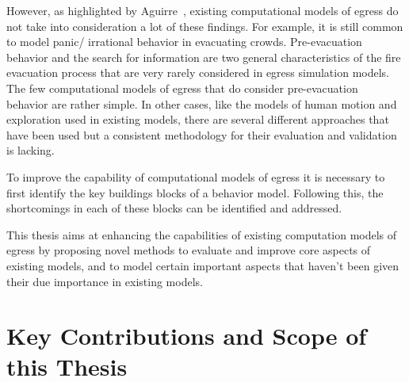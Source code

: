 However, as highlighted by Aguirre~\cite{Aguirre:2004tn}, existing computational models of egress do not take into consideration a lot of these findings. For example, it is still common to model panic/ irrational behavior in evacuating crowds.
 Pre-evacuation behavior and the search for information are two general characteristics of the fire evacuation process that are very rarely considered in egress simulation models. The few computational models of egress that do consider pre-evacuation~\cite{Pires:2005gs,Klupfel:2003wa} behavior are rather simple. In other cases, like the models of human motion and exploration used in existing models, there are several different approaches that have been used but a consistent methodology for their evaluation and validation is lacking.

 To improve the capability of computational models of egress it is necessary to first identify the key buildings blocks of a behavior model. Following this, the shortcomings in each of these blocks can be identified and addressed.


This thesis aims at enhancing the capabilities of existing computation models of egress by proposing novel methods to evaluate and improve core aspects of existing models, and to model certain important aspects that haven't been given their due importance in existing models.


\section{Key Contributions and Scope of this Thesis}
\label{Intro:Contributions}


